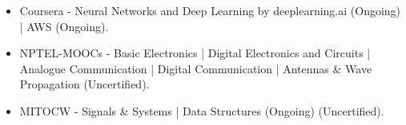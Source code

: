 \begin{itemize}
\item Coursera - Neural Networks and Deep Learning by deeplearning.ai (Ongoing) | AWS (Ongoing). 
\item NPTEL-MOOCs - Basic Electronics | Digital Electronics and Circuits | Analogue Communication | Digital Communication | Antennas \& Wave Propagation (Uncertified).
\item MITOCW - Signals \& Systems | Data Structures (Ongoing) (Uncertified).
\end{itemize}

















